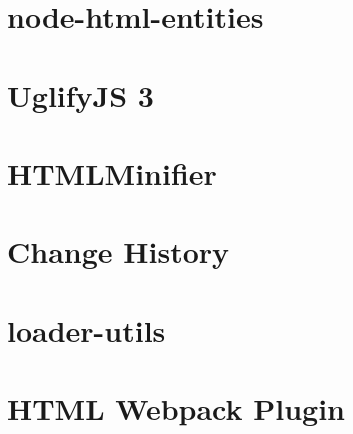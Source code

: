 \documentclass[twoside]{book}
\newcommand{\+}{\discretionary{\mbox{\scriptsize$\hookleftarrow$}}{}{}}
\begin{document}
\chapter{node-\/html-\/entities}
\label{md__c_1_workspace_demo_src_main_script_node_modules_html-entities__r_e_a_d_m_e}

\chapter{Uglify\+JS 3}
\label{md__c_1_workspace_demo_src_main_script_node_modules_html-minifier_node_modules_uglify-js__r_e_a_d_m_e}

\chapter{H\+T\+M\+L\+Minifier}
\label{md__c_1_workspace_demo_src_main_script_node_modules_html-minifier__r_e_a_d_m_e}

\chapter{Change History}
\label{md__c_1_workspace_demo_src_main_script_node_modules_html-webpack-plugin__c_h_a_n_g_e_l_o_g}

\chapter{loader-\/utils}
\label{md__c_1_workspace_demo_src_main_script_node_modules_html-webpack-plugin_node_modules_loader-utils__r_e_a_d_m_e}

\chapter{H\+T\+ML Webpack Plugin}
\label{md__c_1_workspace_demo_src_main_script_node_modules_html-webpack-plugin__r_e_a_d_m_e}

\end{document}
